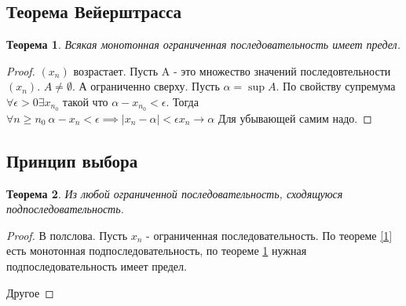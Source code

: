 \documentclass[a4paper]{scrartcl}
\newtheorem{theorem}{Теорема}
\begin{document}
\subsection{Теорема Вейерштрасса}
\begin{theorem} \label{weir}
	Всякая монотонная ограниченная последовательность имеет предел.
\end{theorem}
\begin{proof}
	$(x_n)$ возрастает. Пусть A - это множество значений последовтельности  $(x_n)$. $A \neq \emptyset$.
	А ограниченно сверху. Пусть $\alpha = \sup{A}$. По свойству супремума  $\forall \epsilon > 0 \exists x_{n_0}$ такой что $\alpha - x_{n_0} < \epsilon$. Тогда  $\forall  n\ge n_0 ~ \alpha -x_{n} < \epsilon \implies \mid x_n -\alpha \mid < \epsilon x_n \to \alpha$
	Для убывающей самим надо.
\end{proof}
\subsection{Принцип выбора}
\begin{theorem}
	Из любой ограниченной последовательность, сходящуюся подпоследовательность.
\end{theorem}
\begin{proof}
	В полслова. Пусть $x_n$ - ограниченная последовательность. По теореме \ref{1} есть монотонная подпоследовательность, по теореме \ref{weir} нужная подпоследовательность имеет предел.

	Другое
\end{proof}
\end{document}
